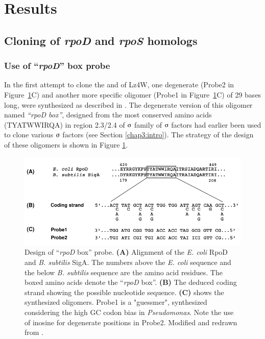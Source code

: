 \section{Results}

\subsection{Cloning of \emph{rpoD} and \emph{rpoS} homologs}

\subsubsection{Use of ``\emph{rpoD}'' box probe}
In the first attempt to clone the  and  of Lz4W,
one degenerate (Probe2 in Figure~\ref{chap3:rpod_box}C) and
another more specific oligomer (Probe1 in
Figure~\ref{chap3:rpod_box}C) of 29 bases long, were synthesized
as described in \citet{Tanaka1988}. The degenerate version of this
oligomer named \textit{``rpoD box''}, designed from the most
conserved amino acids (TYATWWIRQA) in region 2.3/2.4 of
$\sigmaup$ family of $\sigmaup$ factors had earlier been
used to clone various $\sigmaup$ factors (see Section
\ref{chap3:intro}). The strategy of the design of these oligomers
is shown in Figure \ref{chap3:rpod_box}.

\begin{figure}[tbp]
\centering
\includegraphics{figures/chap3_rpod_box}
\caption[Design of ``\textit{rpoD} box'' probe]{Design of
``\textit{rpoD} box'' probe. \textbf{(A)} Alignment of the
\textit{E. coli} RpoD and \textit{B. subtilis} SigA. The numbers
above the \textit{E. coli} sequence and the below \textit{B.
subtilis} sequence are the amino acid residues. The boxed amino
acids denote the ``\textit{rpoD} box''. \textbf{(B)} The deduced
coding strand showing the possible nucleotide sequence.
\textbf{(C)} shows the synthesized oligomers. Probe1 is a
"guessmer", synthesized considering the high GC codon bias in
\emph{Pseudomonas}. Note the use of inosine for degenerate
positions in Probe2. Modified and redrawn from
\citet{Tanaka1988}.} \label{chap3:rpod_box}
\end{figure}

